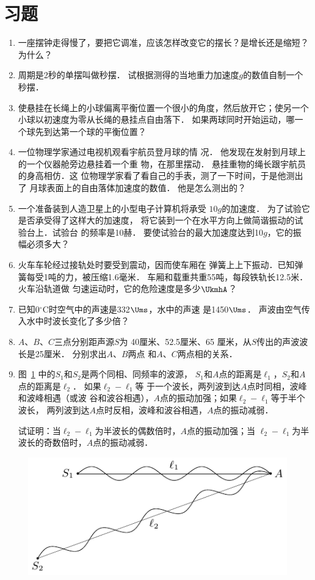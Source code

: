 \section*{习题}
\begin{enumerate}
    \item 一座摆钟走得慢了，要把它调准，应该怎样改变它的摆长？是增长还是缩短？为什么？
    \item 周期是2秒的单摆叫做秒摆．
    试根据测得的当地重力加速度$g$的数值自制一个秒摆．
    \item 使悬挂在长绳上的小球偏离平衡位置一个很小的角度，然后放开它；使另一个小球以初速度为零从长绳的悬挂点自由落下．
    如果两球同时开始运动，哪一个球先到达第一个球的平衡位置？
    \item 一位物理学家通过电视机观看宇航员登月球的情
况．
他发现在发射到月球上的一个仪器舱旁边悬挂着一个重
物，在那里摆动．
悬挂重物的绳长跟宇航员的身高相仿．这
位物理学家看了看自己的手表，测了一下时间，于是他测出了
月球表面上的自由落体加速度的数值．
他是怎么测出的？
\item 一个准备装到人造卫星上的小型电子计算机将承受
$10g$的加速度．
为了试验它是否承受得了这样大的加速度，
将它装到一个在水平方向上做简谐振动的试验台上．试验台
的频率是10赫．
要使试验台的最大加速度达到10$g$，它的振
幅必须多大？
\item 火车车轮经过接轨处时要受到震动，因而使车厢在
弹簧上上下振动．已知弹簧每受1吨的力，被压缩1.6毫米．
车厢和载重共重55吨，每段铁轨长12.5米．
火车沿轨道做
匀速运动时，它的危险速度是多少$\UkmhA$？
\item 已知0$^{\circ}$C时空气中的声速是332$\Ums$，水中的声速
是1450$\Ums$．
声波由空气传入水中时波长变化了多少倍？
\item $A$、$B$、$C$三点分别距声源$S$为 40厘米、52.5厘米、65
厘米，从$S$传出的声波波长是25厘米．
分别求出$A$、$B$两点
和$A$、$C$两点相的关系．
\item 图~\ref{fig_A_9-35} 中的$S_1$和$S_2$是两个同相、同频率的波源，
$S_1$和$A$点的距离是$\ell_1$，$S_2$和$A$点的距离是$\ell_2$．
如果$\ell_2-\ell_1$等
于一个波长，两列波到达$A$点时同相，波峰和波峰相遇（或波
谷和波谷相遇），$A$点的振动加强；如果$\ell_2-\ell_1$等于半个波长，
两列波到达$A$点时反相，波峰和波谷相遇，$A$点的振动减弱．

试证明：当$\ell_2-\ell_1$为半波长的偶数倍时，$A$点的振动加强；当
$\ell_2-\ell_1$为半波长的奇数倍时，$A$点的振动减弱．
\end{enumerate}

\begin{figure}[htbp]
    \centering
    \includegraphics{fig/A/9-35.pdf}
    \caption{}\label{fig_A_9-35}
\end{figure}





